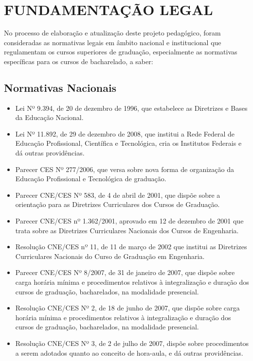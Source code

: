 
\clearpage
\section{FUNDAMENTAÇÃO LEGAL}
\label{FUNDAMENTAÇÃO LEGAL}

No processo de elaboração e atualização deste projeto pedagógico, foram consideradas as normativas legais em âmbito nacional e institucional que regulamentam os cursos superiores de graduação, especialmente as normativas específicas para os cursos de bacharelado, a saber:

\subsection{Normativas Nacionais}

\begin{itemize}
	\item Lei Nº 9.394, de 20 de dezembro de 1996, que estabelece as Diretrizes e Bases da Educação Nacional.
	\item Lei Nº 11.892, de 29 de dezembro de 2008, que institui a Rede Federal de Educação Profissional, Científica e Tecnológica, cria os Institutos Federais e dá outras providências.
	\item Parecer CES Nº 277/2006, que versa sobre nova forma de organização da Educação Profissional e Tecnológica de graduação.
	\item Parecer CNE/CES Nº 583, de 4 de abril de 2001, que dispõe sobre a orientação para as Diretrizes Curriculares dos Cursos de Graduação.
	\item Parecer CNE/CES nº 1.362/2001, aprovado em 12 de dezembro de 2001 que trata sobre as Diretrizes Curriculares Nacionais dos Cursos de Engenharia.
	\item Resolução CNE/CES nº 11, de 11 de março de 2002 que institui as Diretrizes Curriculares Nacionais do Curso de Graduação em Engenharia.
	\item Parecer CNE/CES Nº 8/2007, de 31 de janeiro de 2007, que dispõe sobre carga horária mínima e procedimentos relativos à integralização e duração dos cursos de graduação, bacharelados, na modalidade presencial. 
	\item Resolução CNE/CES Nº 2, de 18 de junho de 2007, que dispõe sobre carga horária mínima e procedimentos relativos à integralização e duração dos cursos de graduação, bacharelados, na modalidade presencial. 
	\item Resolução CNE/CES Nº 3, de 2 de julho de 2007, dispõe sobre procedimentos a serem adotados quanto ao conceito de hora-aula, e dá outras providências. 

\end{itemize}
